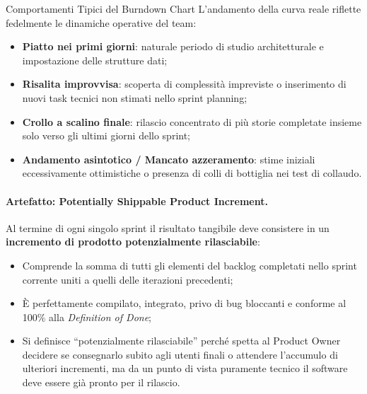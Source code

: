 \documentclass[12pt]{extarticle}
\begin{document}
\begin{cbox}{Comportamenti Tipici del Burndown Chart}
\noindent L'andamento della curva reale riflette fedelmente le dinamiche operative del team:
\begin{itemize}
    \item \textbf{Piatto nei primi giorni}: naturale periodo di studio architetturale e impostazione delle strutture dati;
    \item \textbf{Risalita improvvisa}: scoperta di complessità impreviste o inserimento di nuovi task tecnici non stimati nello sprint planning;
    \item \textbf{Crollo a scalino finale}: rilascio concentrato di più storie completate insieme solo verso gli ultimi giorni dello sprint;
    \item \textbf{Andamento asintotico / Mancato azzeramento}: stime iniziali eccessivamente ottimistiche o presenza di colli di bottiglia nei test di collaudo.
\end{itemize}
\end{cbox}

\paragraph{Artefatto: Potentially Shippable Product Increment.}
Al termine di ogni singolo sprint il risultato tangibile deve consistere in un \textbf{incremento di prodotto potenzialmente rilasciabile}:
\begin{itemize}
    \item Comprende la somma di tutti gli elementi del backlog completati nello sprint corrente uniti a quelli delle iterazioni precedenti;
    \item È perfettamente compilato, integrato, privo di bug bloccanti e conforme al 100\% alla \textit{Definition of Done};
    \item Si definisce ``potenzialmente rilasciabile'' perché spetta al Product Owner decidere se consegnarlo subito agli utenti finali o attendere l'accumulo di ulteriori incrementi, ma da un punto di vista puramente tecnico il software deve essere già pronto per il rilascio.
\end{itemize}
\end{document}
